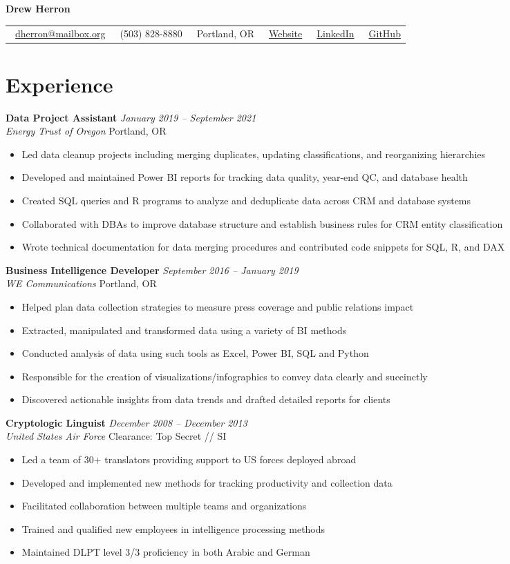 \documentclass[letterpaper,11pt]{article}
\makeatletter
\newcommand{\contact}[6]{
  \begin{center}
    \begin{tabular*}{\textwidth}{@{\extracolsep{\fill}} l l l l l l}
      \faEnvelope\ \href{mailto:#1}{#1} & 
      \faPhone\ #2 & 
      \faMapMarker*\ #3 & 
      \faGlobe\ \href{#4}{Website} & 
      \faLinkedin\ \href{#5}{LinkedIn} &
      \faGithub\ \href{#6}{GitHub}
    \end{tabular*}
  \end{center}
}
\newcommand{\entry}[4]{
  \vspace{0.1em}
  \noindent\textbf{#1} \hfill \textit{#2}
  \\ \textit{#3} \hfill #4
  \vspace{0.3em}
}
\newcommand{\achievement}[1]{
  \vspace{-.5em}
  \item #1
}
\makeatother
\begin{document}
\begin{center}
  {\Huge\textbf{Drew Herron}}
\end{center}
  
  \contact
    {dherron@mailbox.org}
    {(503) 828-8880}
    {Portland, OR}
    {https://www.drewherron.com}
    {https://www.linkedin.com/in/drew-herron}
    {https://github.com/drewherron}

\section{Experience}

\entry{Data Project Assistant}{January 2019 -- September 2021}{Energy Trust of Oregon}{Portland, OR}
\begin{itemize}[leftmargin=*]
  \achievement{Led data cleanup projects including merging duplicates, updating classifications, and reorganizing hierarchies}
  \achievement{Developed and maintained Power BI reports for tracking data quality, year-end QC, and database health}
  \achievement{Created SQL queries and R programs to analyze and deduplicate data across CRM and database systems}
  \achievement{Collaborated with DBAs to improve database structure and establish business rules for CRM entity classification}
  \achievement{Wrote technical documentation for data merging procedures and contributed code snippets for SQL, R, and DAX}
\end{itemize}

\entry{Business Intelligence Developer}{September 2016 -- January 2019}{WE Communications}{Portland, OR}
\begin{itemize}[leftmargin=*]
  \achievement{Helped plan data collection strategies to measure press coverage and public relations impact}
  \achievement{Extracted, manipulated and transformed data using a variety of BI methods}
  \achievement{Conducted analysis of data using such tools as Excel, Power BI, SQL and Python}
  \achievement{Responsible for the creation of visualizations/infographics to convey data clearly and succinctly}
  \achievement{Discovered actionable insights from data trends and drafted detailed reports for clients}
\end{itemize}

\entry{Cryptologic Linguist}{December 2008 -- December 2013}{United States Air Force}{Clearance: Top Secret // SI}
\begin{itemize}[leftmargin=*]
  \achievement{Led a team of 30+ translators providing support to US forces deployed abroad}
  \achievement{Developed and implemented new methods for tracking productivity and collection data}
  \achievement{Facilitated collaboration between multiple teams and organizations}
  \achievement{Trained and qualified new employees in intelligence processing methods}
  \achievement{Maintained DLPT level 3/3 proficiency in both Arabic and German}
\end{itemize}
\end{document}
